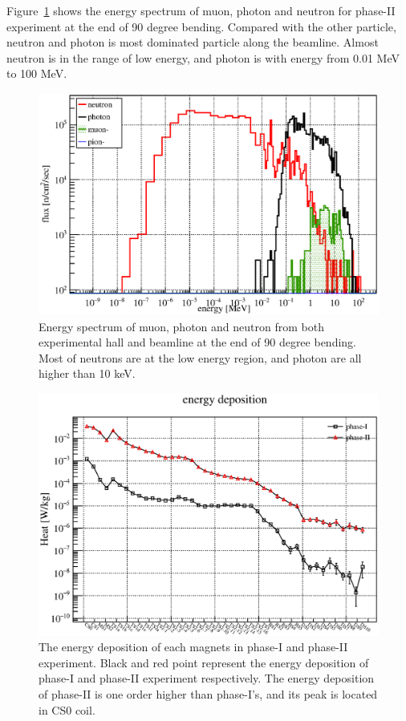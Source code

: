 Figure~\ref{2bending} shows the energy spectrum of muon, photon and neutron for phase-II experiment at the end of 90 degree bending.
Compared with the other particle, neutron and photon is most dominated particle along the beamline.
Almost neutron is in the range of low energy, and photon is with energy from 0.01 MeV to 100 MeV.
  \begin{figure}[H]
   \centering
   \includegraphics[scale=0.43]{chapter3/fig/Neutron}
   \caption{Energy spectrum of muon, photon and neutron from both experimental hall and beamline at the end of 90 degree bending. Most of neutrons are at the low energy region, and photon are all higher than 10 keV.}
   \label{2bending}
  \end{figure}
  \begin{figure}[H]
   \centering
   \includegraphics[scale=0.43]{chapter3/fig/heat}
   \caption{The energy deposition of each magnets in phase-I and phase-II experiment. Black and red point represent the energy deposition of phase-I and phase-II experiment respectively. The energy deposition of phase-II is one order higher than phase-I's, and its peak is located in CS0 coil.}
   \label{2heat}
  \end{figure}
